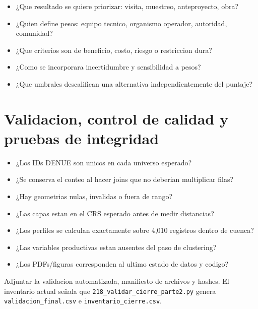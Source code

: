 \documentclass[11pt,letterpaper]{article}
\newcommand{\ruta}[1]{\texttt{#1}}
\begin{document}
\begin{preguntas}
\begin{itemize}
    \item ¿Que resultado se quiere priorizar: visita, muestreo, anteproyecto, obra?
    \item ¿Quien define pesos: equipo tecnico, organismo operador, autoridad, comunidad?
    \item ¿Que criterios son de beneficio, costo, riesgo o restriccion dura?
    \item ¿Como se incorporara incertidumbre y sensibilidad a pesos?
    \item ¿Que umbrales descalifican una alternativa independientemente del puntaje?
\end{itemize}
\end{preguntas}

\section{Validacion, control de calidad y pruebas de integridad}

\begin{preguntas}
\begin{itemize}
    \item ¿Los IDs DENUE son unicos en cada universo esperado?
    \item ¿Se conserva el conteo al hacer joins que no deberian multiplicar filas?
    \item ¿Hay geometrias nulas, invalidas o fuera de rango?
    \item ¿Las capas estan en el CRS esperado antes de medir distancias?
    \item ¿Los perfiles se calculan exactamente sobre 4,010 registros dentro de cuenca?
    \item ¿Las variables productivas estan ausentes del paso de clustering?
    \item ¿Los PDFs/figuras corresponden al ultimo estado de datos y codigo?
\end{itemize}
\end{preguntas}

\begin{evidencia}
Adjuntar la validacion automatizada, manifiesto de archivos y hashes. El inventario actual señala que \ruta{218\_validar\_cierre\_parte2.py} genera \ruta{validacion\_final.csv} e \ruta{inventario\_cierre.csv}.
\end{evidencia}
\end{document}
